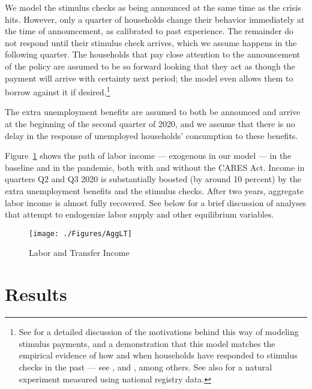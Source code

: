 \documentclass[titlepage,letterpaper]{\econtex}
\begin{document}
We model the stimulus checks as being announced at the same time as the crisis hits.
However, only a quarter of households change their behavior immediately at the time of announcement, as calibrated to past experience.
The remainder do not respond until their stimulus check arrives, which we assume happens in the following quarter.
The households that pay close attention to the announcement of the policy are assumed to be so forward looking that they act as though the payment will arrive with certainty next period; the model even allows them to borrow against it if desired.\footnote{See \cite{carroll_sticky_2020} for a detailed discussion of the motivations behind this way of modeling stimulus payments, and a demonstration that this model matches the empirical evidence of how and when households have responded to stimulus checks in the past --- see \cite{psjmMPC2008}, \cite{brodaParker} and \cite{parker25million}, among others.  See also \cite{fhnMPC} for a natural experiment measured using national registry data.}

The extra unemployment benefits are assumed to both be announced and arrive at the beginning of the second quarter of 2020, and we assume that there is no delay in the response of unemployed households' consumption to these benefits.

\hypertarget{labor-income}{}
Figure~\ref{labor_income} shows the path of labor income --- exogenous in our model --- in the baseline and in the pandemic, both with and without the CARES Act.
Income in quarters Q2 and Q3 2020 is substantially boosted (by around 10 percent) by the extra unemployment benefits and the stimulus checks.
After two years, aggregate labor income is almost fully recovered.  See below for a brief discussion of analyses that attempt to endogenize labor supply and other equilibrium variables.

\begin{figure}
  \centering
  \caption{Labor and Transfer Income}
  \label{labor_income}
  { \texttt{[image: ./Figures/AggLT]}}
\end{figure}


\hypertarget{Results}{}
\section{Results}
\end{document}
